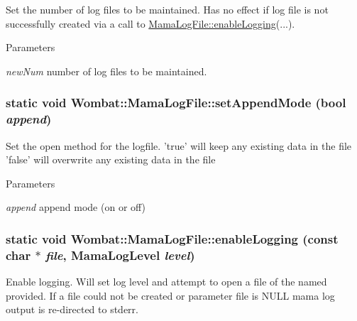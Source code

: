 Set the number of log files to be maintained. Has no effect if log file is not successfully created via a call to \hyperlink{classWombat_1_1MamaLogFile_ad5b9f7b07ccf958ea340c582c89a13a1}{MamaLogFile::enableLogging}(...).


\begin{DoxyParams}{Parameters}
\item[{\em newNum}]number of log files to be maintained. \end{DoxyParams}
\hypertarget{classWombat_1_1MamaLogFile_ae7cfd9a633b4206e89f639c10bf144ac}{
\subsubsection[{setAppendMode}]{\setlength{\rightskip}{0pt plus 5cm}static void Wombat::MamaLogFile::setAppendMode (bool {\em append})}}
\label{classWombat_1_1MamaLogFile_ae7cfd9a633b4206e89f639c10bf144ac}


Set the open method for the logfile. 'true' will keep any existing data in the file 'false' will overwrite any existing data in the file 
\begin{DoxyParams}{Parameters}
\item[{\em append}]append mode (on or off) \end{DoxyParams}
\hypertarget{classWombat_1_1MamaLogFile_ad5b9f7b07ccf958ea340c582c89a13a1}{
\subsubsection[{enableLogging}]{\setlength{\rightskip}{0pt plus 5cm}static void Wombat::MamaLogFile::enableLogging (const char $\ast$ {\em file}, \/  MamaLogLevel {\em level})}}
\label{classWombat_1_1MamaLogFile_ad5b9f7b07ccf958ea340c582c89a13a1}


Enable logging. Will set log level and attempt to open a file of the named provided. If a file could not be created or parameter file is NULL mama log output is re-\/directed to stderr.


